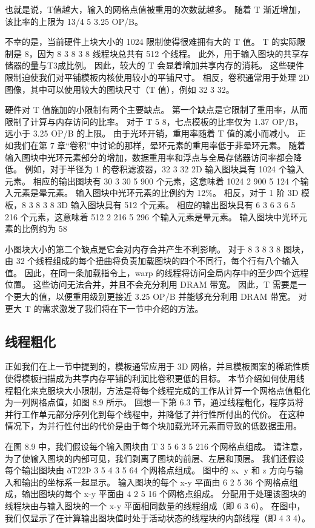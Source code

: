 也就是说，T值越大，输入的网格点值被重用的次数就越多。 随着 T 渐近增加，该比率的上限为 13/4 5 3.25 OP/B。

不幸的是，当前硬件上块大小的 1024 限制使得很难拥有大的 T 值。 T 的实际限制是 8，因为 8 3 8 3 8 线程块总共有 512 个线程。 此外，用于输入图块的共享存储器的量与T3成比例。 因此，较大的 T 会显着增加共享内存的消耗。 这些硬件限制迫使我们对平铺模板内核使用较小的平铺尺寸。 相反，卷积通常用于处理 2D 图像，其中可以使用较大的图块尺寸（T 值），例如 32 3 32。

硬件对 T 值施加的小限制有两个主要缺点。 第一个缺点是它限制了重用率，从而限制了计算与内存访问的比率。 对于 T 5 8，七点模板的比率仅为 1.37 OP/B，远小于 3.25 OP/B 的上限。 由于光环开销，重用率随着 T 值的减小而减小。 正如我们在第 7 章“卷积”中讨论的那样，晕环元素的重用率低于非晕环元素。 随着输入图块中光环元素部分的增加，数据重用率和浮点与全局存储器访问率都会降低。 例如，对于半径为 1 的卷积滤波器，32 3 32 2D 输入图块具有 1024 个输入元素。 相应的输出图块有 30 3 30 5 900 个元素，这意味着 1024 2 900 5 124 个输入元素是晕元素。 输入图块中光环元素的比例约为 12\%。 相反，对于 1 阶 3D 模板，8 3 8 3 8 3D 输入图块具有 512 个元素。 相应的输出图块具有 6 3 6 3 6 5 216 个元素，这意味着 512 2 216 5 296 个输入元素是晕元素。 输入图块中光环元素的比例约为 58%

小图块大小的第二个缺点是它会对内存合并产生不利影响。 对于 8 3 8 3 8 图块，由 32 个线程组成的每个扭曲将负责加载图块的四个不同行，每个行有八个输入值。 因此，在同一条加载指令上，warp 的线程将访问全局内存中的至少四个远程位置。 这些访问无法合并，并且不会充分利用 DRAM 带宽。 因此，T 需要是一个更大的值，以便重用级别更接近 3.25 OP/B 并能够充分利用 DRAM 带宽。 对更大 T 的需求激发了我们将在下一节中介绍的方法。

\subsection{线程粗化}
正如我们在上一节中提到的，模板通常应用于 3D 网格，并且模板图案的稀疏性质使得模板扫描成为共享内存平铺的利润比卷积更低的目标。 本节介绍如何使用线程粗化来克服块大小限制，方法是将每个线程完成的工作从计算一个网格点值粗化为一列网格点值，如图 8.9 所示。 回想一下第 6.3 节，通过线程粗化，程序员将并行工作单元部分序列化到每个线程中，并降低了并行性所付出的代价。 在这种情况下，为并行性付出的代价是由于每个块加载光环元素而导致的低数据重用。

在图 8.9 中，我们假设每个输入图块由 T 3 5 6 3 5 216 个网格点组成。 请注意，为了使输入图块的内部可见，我们剥离了图块的前层、左层和顶层。 我们还假设每个输出图块由 ðT22Þ 3 5 4 3 5 64 个网格点组成。 图中的 x、y 和 z 方向与输入和输出的坐标系一起显示。 输入图块的每个 x-y 平面由 6 2 5 36 个网格点组成，输出图块的每个 x-y 平面由 4 2 5 16 个网格点组成。 分配用于处理该图块的线程块由与输入图块的一个 x-y 平面相同数量的线程组成（即 6 3 6）。 在图中，我们仅显示了在计算输出图块值时处于活动状态的线程块的内部线程（即 4 3 4）。

